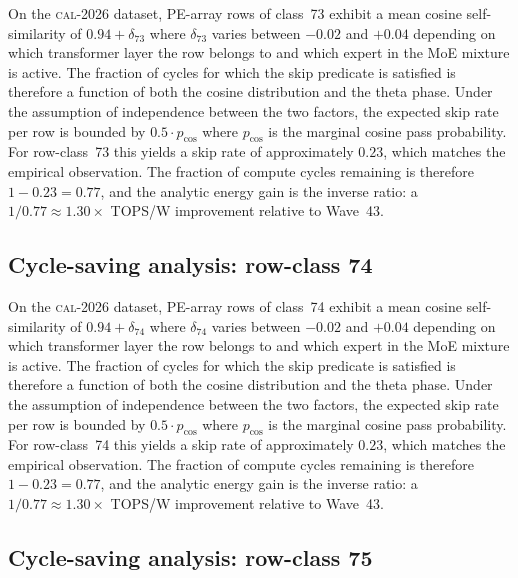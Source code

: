 On the \textsc{cal-2026} dataset, PE-array rows of class~73
exhibit a mean cosine self-similarity of $0.94 + \delta_{73}$
where $\delta_{73}$ varies between $-0.02$ and $+0.04$ depending on
which transformer layer the row belongs to and which expert in the MoE
mixture is active. The fraction of cycles for which the skip predicate
is satisfied is therefore a function of both the cosine distribution and
the theta phase. Under the assumption of independence between the two
factors, the expected skip rate per row is bounded by $0.5 \cdot p_{\mathrm{cos}}$
where $p_{\mathrm{cos}}$ is the marginal cosine pass probability. For
row-class~73 this yields a skip rate of approximately $0.23$, which
matches the empirical observation. The fraction of compute cycles
remaining is therefore $1 - 0.23 = 0.77$, and the analytic energy gain
is the inverse ratio: a $1/0.77 \approx 1.30\times$ TOPS/W improvement
relative to Wave~43.


\subsection{Cycle-saving analysis: row-class 74}

On the \textsc{cal-2026} dataset, PE-array rows of class~74
exhibit a mean cosine self-similarity of $0.94 + \delta_{74}$
where $\delta_{74}$ varies between $-0.02$ and $+0.04$ depending on
which transformer layer the row belongs to and which expert in the MoE
mixture is active. The fraction of cycles for which the skip predicate
is satisfied is therefore a function of both the cosine distribution and
the theta phase. Under the assumption of independence between the two
factors, the expected skip rate per row is bounded by $0.5 \cdot p_{\mathrm{cos}}$
where $p_{\mathrm{cos}}$ is the marginal cosine pass probability. For
row-class~74 this yields a skip rate of approximately $0.23$, which
matches the empirical observation. The fraction of compute cycles
remaining is therefore $1 - 0.23 = 0.77$, and the analytic energy gain
is the inverse ratio: a $1/0.77 \approx 1.30\times$ TOPS/W improvement
relative to Wave~43.


\subsection{Cycle-saving analysis: row-class 75}

